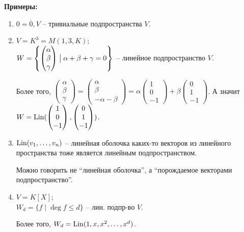 \textbf{Примеры:}
\begin{enumerate}
    \item $0 = {\overline{0}}, V$ -- тривиальные подпространства $V$.
    \item 
    $V = K^3 = M(1, 3, K)$; \\
    $W = \left\{ \begin{pmatrix*} \alpha \\ \beta \\ \gamma 
    \end{pmatrix*} \bigm\vert \alpha + \beta + \gamma = 0 \right\}$
    -- линейное подпространство $V$.

    Более того,
    $ \begin{pmatrix*} \alpha \\ \beta \\ \gamma \end{pmatrix*} =
    \begin{pmatrix*} \alpha \\ \beta \\ -\alpha - \beta \end{pmatrix*} =
    \alpha \begin{pmatrix*} 1 \\ 0 \\ -1 \end{pmatrix*} +
    \beta \begin{pmatrix*} 0 \\ 1 \\ -1 \end{pmatrix*} $.
    А значит $W = \Lin(\begin{pmatrix*} 1 \\ 0 \\ -1 \end{pmatrix*},
    \begin{pmatrix*} 0 \\ 1 \\ -1 \end{pmatrix*})$.

    \item $\operatorname{Lin}(v_1, \dots, v_n)$ -- линейная оболочка каких-то
    векторов из линейного пространства тоже является линейным 
    подпространством.

    Можно говорить не ``линейная оболочка'', а ``порождаемое векторами
    подпространство''.

    \item $V = K[X]$;\\
    $W_d = \{ f \mid \deg f \leqslant d \}$ -- лин. подпр-во $V$.

    Более того, $W_d = \operatorname{Lin}(1, x, x^2, \dots, x^d)$.
\end{enumerate}